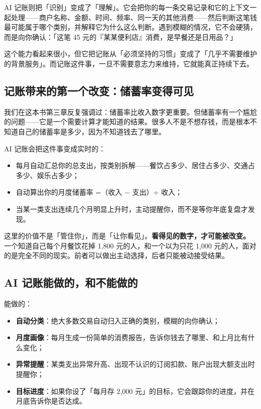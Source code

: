 \documentclass[a4paper,11pt,oneside,fontset=none,UTF8,zihao=-4]{ctexbook}
\providecommand{\tightlist}{\setlength{\itemsep}{2pt}\setlength{\parskip}{1pt}}
\begin{document}
AI
记账则把「识别」变成了「理解」。它会把你的每一条交易记录和它的上下文一起处理------商户名称、金额、时间、频率、同一天的其他消费------然后判断这笔钱最可能属于哪个类别，并解释它为什么这么判断。遇到模糊的情况，它不会硬猜，而是向你确认：「这笔
45 元的『某某便利店』消费，是早餐还是日用品？」

这个能力看起来很小，但它把记账从「必须坚持的习惯」变成了「几乎不需要维护的背景服务」。而记账这件事，一旦不需要意志力来维持，它就能真正持续下去。

\subsection{记账带来的第一个改变：储蓄率变得可见}\label{ux8bb0ux8d26ux5e26ux6765ux7684ux7b2cux4e00ux4e2aux6539ux53d8ux50a8ux84c4ux7387ux53d8ux5f97ux53efux89c1}

我们在这本书第三章反复强调过：储蓄率比收入数字更重要。但储蓄率有一个尴尬的问题------它是一个需要计算才能知道的结果。很多人不是不想存钱，而是根本不知道自己的储蓄率是多少，因为不知道钱去了哪里。

AI 记账会把这件事变成实时的：

\begin{itemize}
\tightlist
\item
  每月自动汇总你的总支出，按类别拆解------餐饮占多少、居住占多少、交通占多少、娱乐占多少；
\item
  自动算出你的月度储蓄率 =（收入 − 支出）÷ 收入；
\item
  当某一类支出连续几个月明显上升时，主动提醒你，而不是等你年底复盘才发现。
\end{itemize}

这里的价值不是「管住你」，而是「让你看见」。\textbf{看得见的数字，才可能被改变。}
一个知道自己每个月餐饮花掉 1,800 元的人，和一个以为只花 1,000
元的人，面对的是完全不同的现实。前者可以做出主动选择，后者只能被动接受结果。

\subsection{AI
记账能做的，和不能做的}\label{ai-ux8bb0ux8d26ux80fdux505aux7684ux548cux4e0dux80fdux505aux7684}

能做的：

\begin{itemize}
\tightlist
\item
  \textbf{自动分类}：绝大多数交易自动归入正确的类别，模糊的向你确认；
\item
  \textbf{月度画像}：每月生成一份简单的消费报告，告诉你钱去了哪里、和上月比有什么变化；
\item
  \textbf{异常提醒}：某类支出异常升高、出现不认识的订阅扣款、账户出现大额支出时提醒你；
\item
  \textbf{目标进度}：如果你设了「每月存 2,000
  元」的目标，它会跟踪你的进度，并在月底告诉你是否达成。
\end{itemize}
\end{document}
